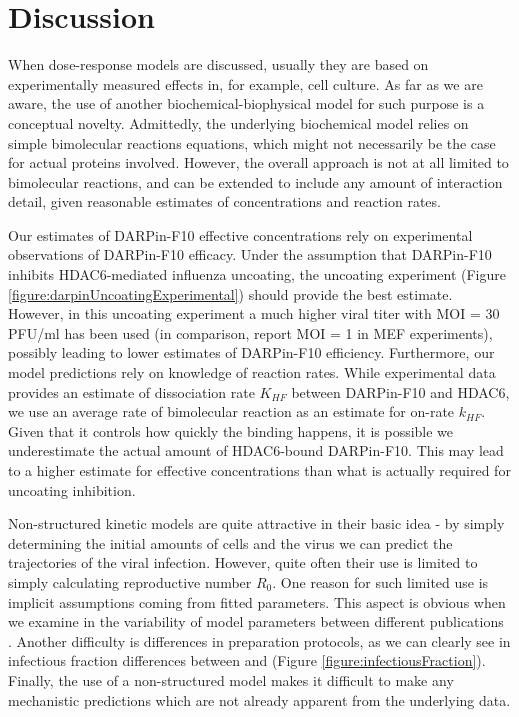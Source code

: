 \section{Discussion}

When dose-response models are discussed, usually they are based on experimentally measured effects in, for example, cell culture. As far as we are aware, the use of another biochemical-biophysical model for such purpose is a conceptual novelty. Admittedly, the underlying biochemical model relies on simple bimolecular reactions equations, which might not necessarily be the case for actual proteins involved. However, the overall approach is not at all limited to bimolecular reactions, and can be extended to include any amount of interaction detail, given reasonable estimates of concentrations and reaction rates.

Our estimates of DARPin-F10 effective concentrations rely on experimental observations of DARPin-F10 efficacy. Under the assumption that DARPin-F10 inhibits HDAC6-mediated influenza uncoating, the uncoating experiment (Figure \ref{figure:darpinUncoatingExperimental}) should provide the best estimate. However, in this uncoating experiment a much higher viral titer with MOI = 30 PFU/ml has been used (in comparison, \cite{banerjee2014influenza} report MOI = 1 in MEF experiments), possibly leading to lower estimates of DARPin-F10 efficiency. Furthermore, our model predictions rely on knowledge of reaction rates. While experimental data provides an estimate of dissociation rate $K_{HF}$ between DARPin-F10 and HDAC6, we use an average rate of bimolecular reaction \cite{bionumbersbimolrate} as an estimate for on-rate $k_{HF}$. Given that it controls how quickly the binding happens, it is possible we underestimate the actual amount of HDAC6-bound DARPin-F10. This may lead to a higher estimate for effective concentrations than what is actually required for uncoating inhibition.

Non-structured kinetic models are quite attractive in their basic idea - by simply determining the initial amounts of cells and the virus we can predict the trajectories of the viral infection. However, quite often their use is limited to simply calculating reproductive number $R_0$. One reason for such limited use is implicit assumptions coming from fitted parameters. This aspect is obvious when we examine in the variability of model parameters between different publications \cite{smith2011influenza}. Another difficulty is differences in preparation protocols, as we can clearly see in infectious fraction differences between \cite{rudiger2019multiscale} and \cite{schulze2009infection} (Figure \ref{figure:infectiousFraction}). Finally, the use of a  non-structured model makes it difficult to make any mechanistic predictions which are not already apparent from the underlying data.

